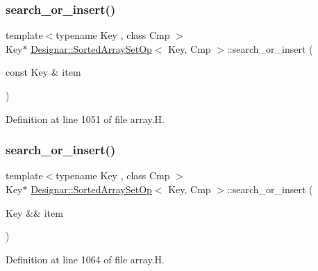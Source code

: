 \subsubsection{\texorpdfstring{search\+\_\+or\+\_\+insert()}{search\_or\_insert()}\hspace{0.1cm}{\footnotesize\ttfamily [1/2]}}
{\footnotesize\ttfamily template$<$typename Key , class Cmp $>$ \\
Key$\ast$ \hyperlink{class_designar_1_1_sorted_array_set_op}{Designar\+::\+Sorted\+Array\+Set\+Op}$<$ Key, Cmp $>$\+::search\+\_\+or\+\_\+insert (\begin{DoxyParamCaption}\item[{const Key \&}]{item }\end{DoxyParamCaption})\hspace{0.3cm}{\ttfamily [inline]}}



Definition at line 1051 of file array.\+H.

\mbox{\label{class_designar_1_1_sorted_array_set_op_ad0299c41514cf11f5a418b9e46994580}} 
\subsubsection{\texorpdfstring{search\+\_\+or\+\_\+insert()}{search\_or\_insert()}\hspace{0.1cm}{\footnotesize\ttfamily [2/2]}}
{\footnotesize\ttfamily template$<$typename Key , class Cmp $>$ \\
Key$\ast$ \hyperlink{class_designar_1_1_sorted_array_set_op}{Designar\+::\+Sorted\+Array\+Set\+Op}$<$ Key, Cmp $>$\+::search\+\_\+or\+\_\+insert (\begin{DoxyParamCaption}\item[{Key \&\&}]{item }\end{DoxyParamCaption})\hspace{0.3cm}{\ttfamily [inline]}}



Definition at line 1064 of file array.\+H.

\mbox{\label{class_designar_1_1_sorted_array_set_op_ad08d29cf21ed0afa0e59ab86fb171108}} 

